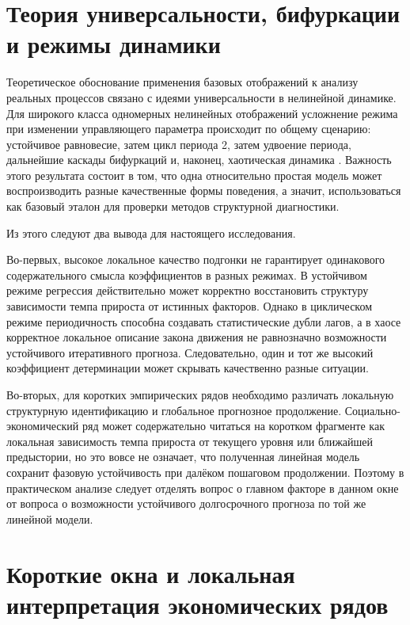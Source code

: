 \section{Теория универсальности, бифуркации и режимы динамики}
\label{sec:universality-bifurcations-regimes}

Теоретическое обоснование применения базовых отображений к анализу реальных процессов связано с идеями универсальности в нелинейной динамике. Для широкого класса одномерных нелинейных отображений усложнение режима при изменении управляющего параметра происходит по общему сценарию: устойчивое равновесие, затем цикл периода 2, затем удвоение периода, дальнейшие каскады бифуркаций и, наконец, хаотическая динамика \cite{feigenbaum-ufn,strogatz,malinetsky}. Важность этого результата состоит в том, что одна относительно простая модель может воспроизводить разные качественные формы поведения, а значит, использоваться как базовый эталон для проверки методов структурной диагностики.

Из этого следуют два вывода для настоящего исследования.

Во-первых, высокое локальное качество подгонки не гарантирует одинакового содержательного смысла коэффициентов в разных режимах. В устойчивом режиме регрессия действительно может корректно восстановить структуру зависимости темпа прироста от истинных факторов. Однако в циклическом режиме периодичность способна создавать статистические дубли лагов, а в хаосе корректное локальное описание закона движения не равнозначно возможности устойчивого итеративного прогноза. Следовательно, один и тот же высокий коэффициент детерминации может скрывать качественно разные ситуации.

Во-вторых, для коротких эмпирических рядов необходимо различать локальную структурную идентификацию и глобальное прогнозное продолжение. Социально-экономический ряд может содержательно читаться на коротком фрагменте как локальная зависимость темпа прироста от текущего уровня или ближайшей предыстории, но это вовсе не означает, что полученная линейная модель сохранит фазовую устойчивость при далёком пошаговом продолжении. Поэтому в практическом анализе следует отделять вопрос о главном факторе в данном окне от вопроса о возможности устойчивого долгосрочного прогноза по той же линейной модели.

\section{Короткие окна и локальная интерпретация экономических рядов}
\label{sec:short-windows-and-local-interpretation}

